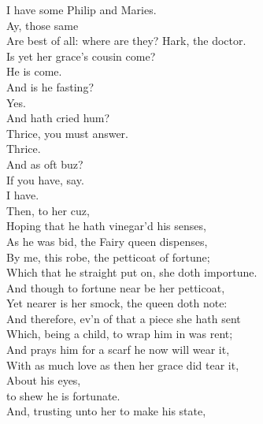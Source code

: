 \documentclass{memoir}
\begin{document}
\begin{drama*}
\dapperspeaks  I have some Philip and Maries.\\
\facespeaks {} Ay, those same\\
 Are best of all: where are they? Hark, the doctor.\\
\subtlespeaks {} Is yet her grace's cousin come?\\
\facespeaks  He is come.\\
\subtlespeaks {} And is he fasting?\\
\facespeaks {} Yes.\\
\subtlespeaks {} And hath cried hum?\\
\facespeaks  Thrice, you must answer.\\
\dapperspeaks {} Thrice.\\
\subtlespeaks {} And as oft buz?\\
\facespeaks  If you have, say.\\
\dapperspeaks {} I have.\\
\subtlespeaks {} Then, to her cuz,\\
 Hoping that he hath vinegar'd his senses,\\
 As he was bid, the Fairy queen dispenses,\\
 By me, this robe, the petticoat of fortune;\\
 Which that he straight put on, she doth importune.\\
 And though to fortune near be her petticoat,\\
 Yet nearer is her smock, the queen doth note:\\
 And therefore, ev'n of that a piece she hath sent\\
 Which, being a child, to wrap him in was rent;\\
 And prays him for a scarf he now will wear it,\\
 With as much love as then her grace did tear it,\\
 About his eyes,\\
 to shew he is fortunate.\\
 And, trusting unto her to make his state,\\

\end{drama*}
\end{document}
